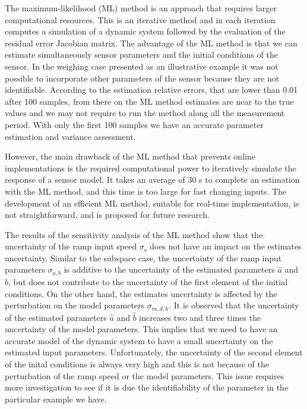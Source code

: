 The maximum-likelihood (ML) method is an approach that requires larger computational resources.
This is an iterative method and in each iteration computes a simulation of a dynamic system followed by the evaluation of the residual error Jacobian matrix.
The advantage of the ML method is that we can estimate simultaneously sensor parameters and the initial conditions of the sensor.
In the weighing case presented as an illustrative example it was not possible to incorporate other parameters of the sensor because they are not identifiable.
According to the estimation relative errors, that are lower than 0.01 after 100 samples, from there on the ML method estimates are near to the true values and we may not require to run the method along all the measurement period.
With only the first 100 samples we have an accurate parameter estimation and variance assessment.

However, the main drawback of the ML method that prevents online implementations is the required computational power to iteratively simulate the response of a sensor model.
It takes an average of 30 s to complete an estimation with the ML method, and this time is too large for fast changing inputs.
The development of an efficient ML method, suitable for real-time implementation, is not straightforward, and is proposed for future research.

The results of the sensitivity analysis of the ML method show that the uncertainty of the ramp input speed $\sigma_{\mathrm{s}}$ does not have an impact on the estimates uncertainty.
Similar to the subspace case, the uncertainty of the ramp input parameters $\sigma_{a,b}$ is additive to the uncertainty of the estimated parameters $\widehat{a}$ and $\widehat{b}$, but does not contribute to the uncertainty of the first element of the initial conditions.
On the other hand, the estimates uncertainty is affected by the perturbation on the model parameters $\sigma_{m,d,k}$.
It is observed that the uncertainty of the estimated parameters $\widehat{a}$ and $\widehat{b}$ increases two and three times the uncertainty of the model parameters.
This implies that we need to have an accurate model of the dynamic system to have a small uncertainty on the estimated input parameters.
Unfortunately, the uncertainty of the second element of the inital conditions is always very high and this is not because of the perturbation of the ramp speed or the model parameters. 
This issue requires more investigation to see if it is due the identifiability of the parameter in the particular example we have.


